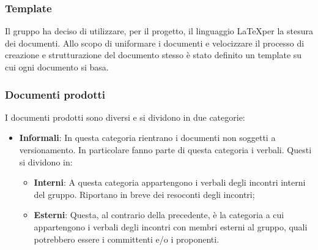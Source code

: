 \documentclass[../norme-di-progetto.tex]{subfiles}
\begin{document}
\subsubsection{Template}
Il gruppo ha deciso di utilizzare, per il progetto, il linguaggio \LaTeX per la stesura dei documenti. Allo scopo di uniformare i documenti e velocizzare il processo di creazione e strutturazione del documento stesso è stato definito un template su cui ogni documento si basa.

\subsubsection{Documenti prodotti}
I documenti prodotti sono diversi e si dividono in due categorie:
\begin{itemize}
    \item \textbf{Informali}: In questa categoria rientrano i documenti non soggetti a versionamento. In particolare fanno parte di questa categoria i verbali. Questi si dividono in:
    \begin{itemize}
        \item \textbf{Interni}: A questa categoria appartengono i verbali degli incontri interni del gruppo. Riportano in breve dei resoconti degli incontri;
        \item \textbf{Esterni}: Questa, al contrario della precedente, è la categoria a cui appartengono i verbali degli incontri con membri esterni al gruppo, quali potrebbero essere i committenti e/o i proponenti.
    \end{itemize}
    

\end{itemize}
\end{document}
